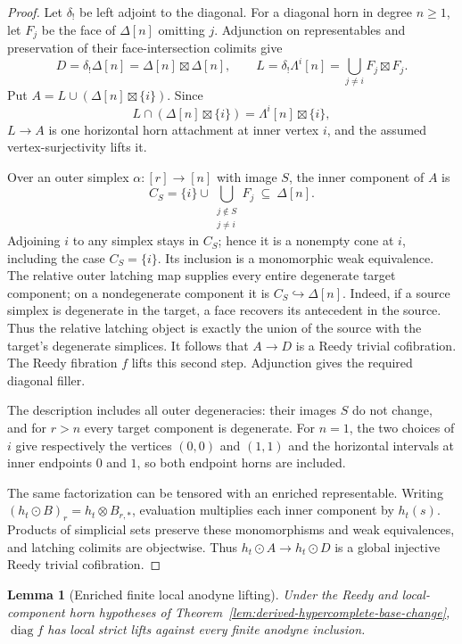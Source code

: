 \documentclass[12pt]{amsart}
\newtheorem{lem}[thm]{Lemma}
\theoremstyle{definition}
\theoremstyle{remark}
\numberwithin{equation}{section}
\begin{document}
\begin{proof}
Let $\delta_!$ be left adjoint to the diagonal.
For a diagonal horn in degree $n\ge1$, let $F_j$
be the face of $\Delta[n]$ omitting $j$. Adjunction on
representables and preservation of their face-intersection
colimits give
\[
 D=\delta_!\Delta[n]=\Delta[n]\boxtimes\Delta[n],
 \qquad
 L=\delta_!\Lambda^i[n]=\bigcup_{j\ne i}F_j\boxtimes F_j.
\]
Put $A=L\cup(\Delta[n]\boxtimes\{i\})$. Since
\[
 L\cap(\Delta[n]\boxtimes\{i\})
       =\Lambda^i[n]\boxtimes\{i\},
\]
$L\to A$ is one horizontal horn attachment at inner
vertex $i$, and the assumed vertex-surjectivity lifts it.

Over an outer simplex $\alpha:[r]\to[n]$ with image $S$,
the inner component of $A$ is
\[
 C_S=\{i\}\cup
       \bigcup_{\substack{j\notin S\\j\ne i}}F_j
       \ \subseteq\ \Delta[n].
\]
Adjoining $i$ to any simplex stays in $C_S$; hence it
is a nonempty cone at $i$, including the case
$C_S=\{i\}$. Its inclusion is a monomorphic weak
equivalence. The relative outer latching map supplies
every entire degenerate target component; on a
nondegenerate component it is $C_S\hookrightarrow\Delta[n]$.
Indeed, if a source simplex is degenerate in the target,
a face recovers its antecedent in the source. Thus the
relative latching object is exactly the union of the
source with the target's degenerate simplices.
It follows that $A\to D$ is a Reedy trivial cofibration.
The Reedy fibration $f$ lifts this second step.
Adjunction gives the required diagonal filler.

The description includes all outer degeneracies: their
images $S$ do not change, and for $r>n$ every target
component is degenerate. For $n=1$, the two choices of
$i$ give respectively the vertices $(0,0)$ and $(1,1)$
and the horizontal intervals at inner endpoints $0$
and $1$, so both endpoint horns are included.

The same factorization can be tensored with an enriched
representable. Writing $(h_t\odot B)_r=h_t\otimes B_{r,*}$,
evaluation multiplies each inner component by $h_t(s)$.
Products of simplicial sets preserve these monomorphisms
and weak equivalences, and latching colimits are
objectwise. Thus $h_t\odot A\to h_t\odot D$ is a
global injective Reedy trivial cofibration.
\end{proof}

\begin{lem}[Enriched finite local anodyne lifting]
Under the Reedy and local-component horn hypotheses of
Theorem~\ref{lem:derived-hypercomplete-base-change},
$\operatorname{diag}f$ has local strict lifts against
every finite anodyne inclusion.
\label{lem:enriched-diagonal-local-lifting}
\end{lem}
\end{document}
